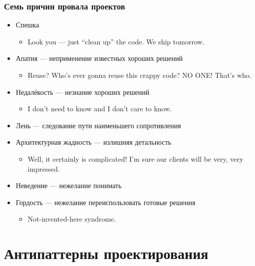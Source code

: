 \documentclass[xetex,mathserif,serif]{beamer}
\begin{document}
	\begin{frame}
		\frametitle{Семь причин провала проектов}
		\begin{footnotesize}
			\begin{itemize}
				\item Спешка
				\begin{itemize}
					\item Look you --- just ``clean up'' the code. We ship tomorrow.
				\end{itemize}
				\item Апатия --- неприменение известных хороших решений
				\begin{itemize}
					\item Reuse? Who’s ever gonna reuse this crappy code? NO ONE! That’s who.
				\end{itemize}
				\item Недалёкость --- незнание хороших решений
				\begin{itemize}
					\item I don’t need to know and I don’t care to know.
				\end{itemize}
				\item Лень --- следование пути наименьшего сопротивления
				\item Архитектурная жадность --- излишняя детальность
				\begin{itemize}
					\item Well, it certainly is complicated! I’m sure our clients will be very, very impressed.
				\end{itemize}
				\item Неведение --- нежелание понимать
				\item Гордость --- нежелание переиспользовать готовые решения
				\begin{itemize}
					\item Not-invented-here syndrome.
				\end{itemize}
			\end{itemize}
		\end{footnotesize}
	\end{frame}

	\section{Антипаттерны проектирования}
\end{document}

